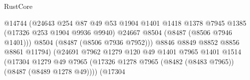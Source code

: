 \begin{lexlean}{RustCore}
\begin{coremodule}
                                                    @14744
                                                    (@24643
                                                      @254
                                                      @87
                                                      @49
                                                      @53
                                                      @1904
                                                      @1401
                                                      @1418
                                                      @1378
                                                      @7945
                                                      @1385
                                                      (@17326 @253 @1904 @9936 @9940)
                                                      @24667
                                                      @8504
                                                      (@8487 (@8506 @7946 @1401)))
                                                    @8504
                                                    (@8487 (@8506 @7936 @7952)))
                                                  @8846
                                                  @8849
                                                  @8852
                                                  @8856
                                                  @8861
                                                  @11794)
                                                (@24691
                                                  @7962
                                                  @1279
                                                  @120
                                                  @49
                                                  @1401
                                                  @7965
                                                  @1401
                                                  @1514
                                                  (@17304
                                                    @1279
                                                    @49
                                                    @7965
                                                    (@17326
                                                      @1278
                                                      @7965
                                                      (@8482 (@8483 @7965))
                                                      (@8487 (@8489 @1278 @49))))
                                                  (@17304

\end{coremodule}
\end{lexlean}
